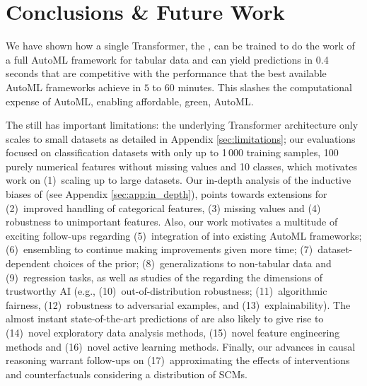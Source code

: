 \documentclass{article}
\begin{document}

\section{Conclusions \& Future Work}
We have shown how a single Transformer, the \methodname{}, can be trained to do the work of a full AutoML framework for tabular data and can yield predictions in 0.4 seconds that are competitive with the performance that the best available AutoML frameworks achieve in $5$ to $60$ minutes.
This
slashes the computational expense of AutoML, enabling affordable, green, AutoML.

The \methodname{} still has important limitations: the underlying Transformer architecture only scales to small datasets as detailed in Appendix \ref{sec:limitations}; our evaluations focused on classification datasets with only up to 1\,000 training samples, 100 purely numerical features without missing values and 10 classes, which motivates work on (1)~scaling up to large datasets. Our in-depth analysis of the inductive biases of \methodname{} (see Appendix \ref{sec:app:in_depth}), points towards extensions for (2)~improved handling of categorical features, (3) missing values and (4) robustness to unimportant features. Also, our work motivates a multitude of exciting follow-ups regarding (5)~integration of \methodname{} into existing AutoML frameworks; (6)~ensembling to continue making improvements given more time; (7)~dataset-dependent choices of the prior; (8)~generalizations to non-tabular data and (9)~regression tasks, as well as studies of the \methodname{} regarding the dimensions of trustworthy AI (e.g., (10)~out-of-distribution robustness; (11)~algorithmic fairness, (12)~robustness to adversarial examples, and (13)~explainability). The almost instant state-of-the-art predictions of \methodname{} are also likely to give rise to (14)~novel exploratory data analysis methods, (15)~novel feature engineering methods and (16)~novel active learning methods. Finally, our advances in causal reasoning warrant follow-ups on (17)~approximating the effects of interventions and counterfactuals considering a distribution of SCMs.
\end{document}
